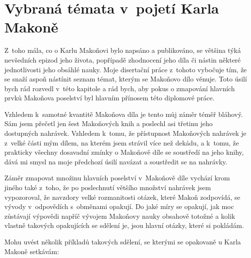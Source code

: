 \chapter{Vybraná témata v~pojetí Karla Makoně}
\label{kap:temata}

Z~toho mála, co o Karlu Makoňovi bylo napsáno a publikováno, se většina týká
nevšedních epizod jeho života, popřípadě zhodnocení jeho díla či nástin některé
jednotlivosti jeho obsáhlé nauky. Moje disertační práce z~tohoto vybočuje tím,
že se snaží aspoň nástínit seznam témat, kterým se Makoňovo dílo věnuje. Toto
úsilí bych rád rozvedl v~této kapitole a rád bych, aby pokus o zmapování
hlavních prvků Makoňova poselství byl hlavním přínosem této diplomové práce.

Vzhledem k~samotné kvantitě Makoňova díla je tento můj záměr téměř bláhový. Sám
jsem přečetl jen šest Makoňových knih a poslechl asi třetinu jeho
dostupných nahrávek. Vzhledem k~tomu, že přístupnost Makoňových nahrávek je
z~velké části mým dílem, na kterém jsem strávil více než dekádu, a k~tomu, že
prakticky všechny dosavadní zmínky o Makoňově díle se soustředí na jeho knihy,
dává mi smysl na moje předchozí úsilí navázat a soustředit se na nahrávky.

Záměr zmapovat množinu hlavních poselství v~Makoňově díle vychází krom jiného
také z~toho, že po poslechnutí většího množství nahrávek jsem vypozoroval,
že navzdory velké rozmanitosti otázek, které Makoň zodpovídá, se vývody
v~odpovědích s~obměnami opakují. Do jaké míry se opakují, jak moc zůstávají
výpovědi napříč vývojem Makoňovy nauky obsahově totožné a kolik vlastně
takových opakujících se sdělení je, jsou hlavní otázky, které si pokládám.

Mohu uvést několik příkladů takových sdělení, se kterými se
opakovaně u Karla Makoně setkávám:

